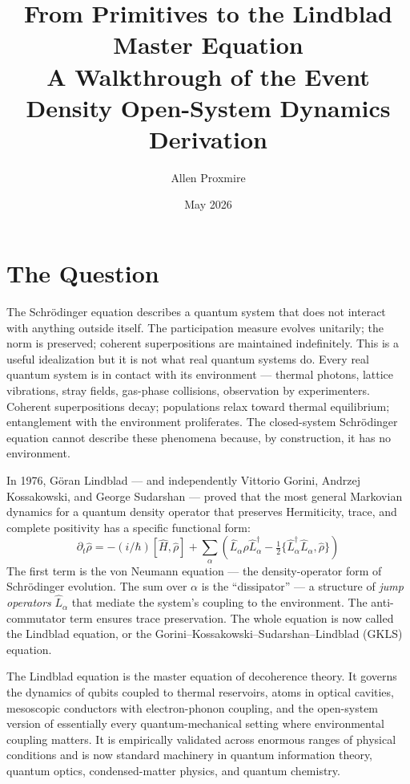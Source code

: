 \documentclass[11pt,a4paper]{article}
\title{\vspace{-1cm}\Large\bfseries From Primitives to the Lindblad Master Equation\\[6pt]
\large\mdseries A Walkthrough of the Event Density Open-System Dynamics Derivation}
\author{Allen Proxmire}
\date{May 2026}
\begin{document}
\maketitle
\thispagestyle{empty}

\section{The Question}

The Schr\"odinger equation describes a quantum system that does not interact with anything outside itself. The participation measure evolves unitarily; the norm is preserved; coherent superpositions are maintained indefinitely. This is a useful idealization but it is not what real quantum systems do. Every real quantum system is in contact with its environment --- thermal photons, lattice vibrations, stray fields, gas-phase collisions, observation by experimenters. Coherent superpositions decay; populations relax toward thermal equilibrium; entanglement with the environment proliferates. The closed-system Schr\"odinger equation cannot describe these phenomena because, by construction, it has no environment.

In 1976, G\"oran Lindblad --- and independently Vittorio Gorini, Andrzej Kossakowski, and George Sudarshan --- proved that the most general Markovian dynamics for a quantum density operator that preserves Hermiticity, trace, and complete positivity has a specific functional form:
\[
\partial_t \hat\rho = -(i/\hbar)[\hat H, \hat\rho] + \sum_\alpha\left(\hat L_\alpha \hat\rho \hat L_\alpha^\dagger - \tfrac{1}{2}\{\hat L_\alpha^\dagger \hat L_\alpha, \hat\rho\}\right)
\]
The first term is the von Neumann equation --- the density-operator form of Schr\"odinger evolution. The sum over $\alpha$ is the ``dissipator'' --- a structure of \emph{jump operators} $\hat L_\alpha$ that mediate the system's coupling to the environment. The anti-commutator term ensures trace preservation. The whole equation is now called the Lindblad equation, or the Gorini--Kossakowski--Sudarshan--Lindblad (GKLS) equation.

The Lindblad equation is the master equation of decoherence theory. It governs the dynamics of qubits coupled to thermal reservoirs, atoms in optical cavities, mesoscopic conductors with electron-phonon coupling, and the open-system version of essentially every quantum-mechanical setting where environmental coupling matters. It is empirically validated across enormous ranges of physical conditions and is now standard machinery in quantum information theory, quantum optics, condensed-matter physics, and quantum chemistry.
\end{document}
